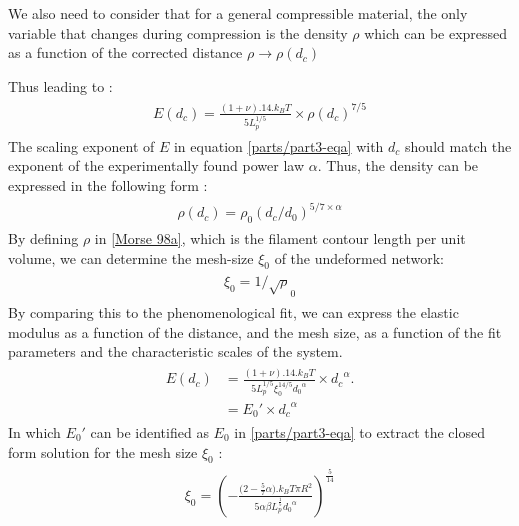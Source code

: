 \documentclass[A4paperpaper,11pt,english]{sphinxmanual}
\begin{document}
We also need to consider that for a general compressible material, the
only variable that changes during compression is the density \(\rho\)
which can be expressed as a function of the corrected distance \(\rho \to
\rho(d_c)\)

Thus leading to :
\label{parts/part3:equation-eqa}\begin{gather}
\begin{split}E(d_c)=\frac{ (1+\nu).14.k_BT}{5L_p^{1/5}}\times \rho(d_c)^{7/5}\end{split}\label{parts/part3-eqa}
\end{gather}
The scaling exponent of \(E\) in equation \eqref{parts/part3-eqa} with \(d_c\) should match the exponent
of the experimentally found power law \(\alpha\). Thus, the density can be
expressed in the following form :
\label{parts/part3:equation-eq-rho}\begin{gather}
\begin{split}\rho(d_c)=\rho_0(d_c/d_0)^{5/7\times\alpha}\end{split}\label{parts/part3-eq-rho}
\end{gather}
By defining \(\rho\) in {\hyperref[parts/part3:morse1998a]{{[}Morse 98a{]}}}, which is
the filament contour length per unit volume, we can determine the
mesh-size \(\xi_0\) of the undeformed network:
\label{parts/part3:equation-eqa38}\begin{gather}
\begin{split}\xi_0 = 1/\sqrt\rho_0\end{split}\label{parts/part3-eqa38}
\end{gather}
By comparing this to the phenomenological fit, we can express the elastic
modulus as a function of the distance, and the mesh size, as a function of the
fit parameters and the characteristic scales of the system.
\label{parts/part3:equation-eqb}\begin{gather}
\begin{split}E(d_c)     &=  \frac{(1+\nu).14.k_BT}{5L_p^{1/5}\xi_0^{14/5} \left.d_0\right.^{\alpha}}\times \left.d_c\right.^{\alpha}.\\
                &=  E_0' \times \left.d_c\right.^{\alpha}\end{split}\label{parts/part3-eqb}
\end{gather}
In which \(E_0'\) can be identified as \(E_0\) in \eqref{parts/part3-eqa} to extract the
closed form solution for the mesh size \(\xi_0\) :
\label{parts/part3:equation-eqa39}\begin{gather}
\begin{split}\xi_0=\left(-\frac{({2-\frac{5}{7}\alpha)}.k_BT\pi R^2}{5\alpha \beta L_p^{\frac{1}{5}}\left.d_0\right.^{\alpha}}\right)^{\frac{5}{14}}\end{split}\label{parts/part3-eqa39}
\end{gather}
\end{document}
